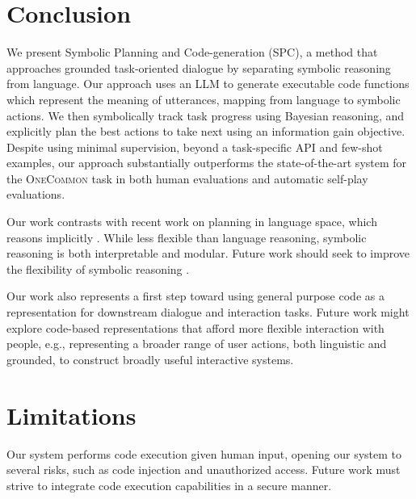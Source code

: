 \documentclass[11pt]{article}
\newcommand{\system}{SPC}
\begin{document}
\section{Conclusion}
We present Symbolic Planning and Code-generation (\system{}), a method that approaches grounded task-oriented dialogue by separating symbolic reasoning from language.  Our approach uses an LLM to generate executable code functions which represent the meaning of utterances, mapping from language to symbolic actions. We then symbolically track task progress using Bayesian reasoning,  and explicitly plan the best actions to take next using an information gain objective. 
Despite using minimal supervision, beyond a task-specific API and few-shot examples, our approach substantially outperforms the state-of-the-art system for the \textsc{OneCommon} task in both human evaluations and automatic self-play evaluations. 

Our work contrasts with recent work on planning in language space, which reasons implicitly \citep{cot,yarats2017rollout,bamcp}.
While less flexible than language reasoning, symbolic reasoning is both interpretable and modular.
Future work should seek to improve the flexibility of symbolic reasoning \citep{wong2023word}.

Our work also represents a first step toward using general purpose code as a representation for downstream dialogue and interaction tasks. Future work might explore code-based representations that afford more flexible interaction with people, e.g., representing a broader range of user actions, both linguistic and grounded, to construct broadly useful interactive systems.

\section*{Limitations}
Our system performs code execution given human input,
opening our system to several risks, such as code injection and unauthorized access.
Future work must strive to integrate code execution capabilities in a secure manner.
\end{document}
